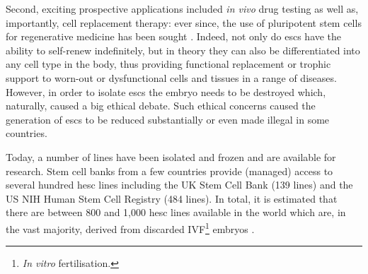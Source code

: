 Second, exciting prospective applications included \textit{in vivo} drug testing as well as, importantly, cell replacement therapy: ever since, the use of pluripotent stem cells for regenerative medicine has been sought \cite{kimbrel2015current}.
Indeed, not only do \glspl{esc} have the ability to self-renew indefinitely, but in theory they can also be differentiated into any cell type in the body, thus providing functional replacement or trophic support to worn-out or dysfunctional cells and tissues in a range of diseases. 
\\

However, in order to isolate \glspl{esc} the embryo needs to be destroyed which, naturally, caused a big ethical debate.
Such ethical concerns caused the generation of \glspl{esc} to be reduced substantially or even made illegal in some countries.

Today, a number of lines have been isolated and frozen and are available for research.
Stem cell banks from a few countries provide (managed) access to several hundred \gls{hesc} lines including the UK Stem Cell Bank (139 lines) and the US NIH Human Stem Cell Registry (484 lines).
In total, it is estimated that there are between 800 and 1,000 \gls{hesc} lines available in the world which are, in the vast majority, derived from discarded IVF\footnote{\textit{In vitro} fertilisation.} embryos \cite{isasi2009governing}.\\








